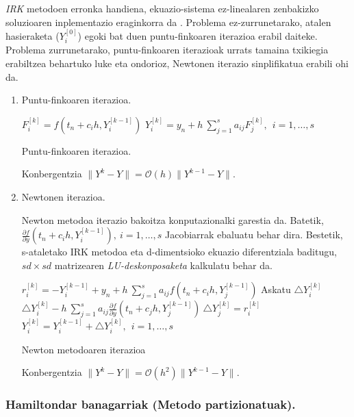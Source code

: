 \emph{IRK} metodoen erronka handiena, ekuazio-sistema ez-linealaren zenbakizko soluzioaren inplementazio eraginkorra da \cite{Hairer2006,SSerna2015b}. Problema ez-zurrunetarako, atalen hasieraketa ($Y_i^{[0]}$) egoki bat duen puntu-finkoaren iterazioa erabil daiteke. Problema zurrunetarako, puntu-finkoaren iterazioak urrats tamaina txikiegia erabiltzea behartuko luke eta ondorioz, Newtonen iterazio sinplifikatua erabili ohi da.  

\begin{enumerate}

\item Puntu-finkoaren iterazioa.

\begin{algorithm}[H]
  {
   $F_{i}^{[k]}=f(t_n+c_ih,Y_i^{[k-1]})$\;
   $Y_{i}^{[k]}=y_{n}+ h \ \sum\limits_{j=1}^{s} a_{ij} F_{j}^{[k]} , \ \  i=1,\dots,s$\; 
  }
 \caption{Puntu-finkoaren iterazioa.}
 \label{alg:rkpf}
\end{algorithm}

Konbergentzia $\|Y^k-Y\|=\mathcal{O}(h) \|Y^{k-1}-Y\|$.


\item Newtonen iterazioa. 

Newton metodoa iterazio bakoitza konputazionalki garestia da. Batetik,  $\frac{\partial f}{\partial y}(t_n+c_ih,Y_i^{[k-1]}), \ i=1,\dots,s$ Jacobiarrak ebaluatu behar dira. Bestetik, s-ataletako IRK metodoa eta  d-dimentsioko ekuazio diferentziala baditugu, $sd \times sd$ matrizearen \emph{LU-deskonposaketa} kalkulatu behar da.    

\begin{algorithm}[H]
  {
   $r_{i}^{[k]}=-Y_i^{[k-1]}+y_n+h \ \sum\limits_{j=1}^{s} a_{ij} f(t_n+c_ih,Y_j^{[k-1]}) $\;
   Askatu $\triangle Y_i^{[k]}$\;
   $\triangle Y_i^{[k]}-h \ \sum\limits_{j=1}^{s} a_{ij} \frac{\partial f}{\partial y}(t_n+c_jh,Y_j^{[k-1]}) \ \triangle Y_j^{[k]}=r_i^{[k]}$\;
   $Y_i^{[k]}=Y_i^{[k-1]}+\triangle Y_i^{[k]}, \ \  i=1,\dots,s$\; 
  }
 \caption{Newton metodoaren iterazioa}
\end{algorithm}

Konbergentzia $\|Y^k-Y\|=\mathcal{O}(h^2) \|Y^{k-1}-Y\|$.

\end{enumerate}

\subsubsection*{Hamiltondar banagarriak (Metodo partizionatuak).}

